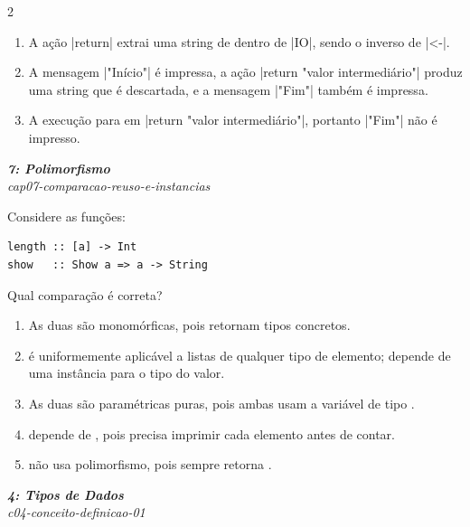 \documentclass[a4paper,10pt,brazil]{article}
\begin{document}
\begin{multicols}{2}
\begin{enumerate}
  \item A ação \haskellinline|return| extrai uma string de dentro de \haskellinline|IO|, sendo o inverso de \haskellinline|<-|.

  \item A mensagem \haskellinline|"Início"| é impressa, a ação \haskellinline|return "valor intermediário"| produz uma string que é descartada, e a mensagem \haskellinline|"Fim"| também é impressa.

  \item A execução para em \haskellinline|return "valor intermediário"|, portanto \haskellinline|"Fim"| não é impresso.


\end{enumerate}

\begin{flushright}
  \footnotesize
  \textit{\textbf{7: Polimorfismo}}\\
  \textit{cap07-comparacao-reuso-e-instancias}\\

\end{flushright}
Considere as funções:

\begin{verbatim}
length :: [a] -> Int
show   :: Show a => a -> String
\end{verbatim}

Qual comparação é correta?

\begin{enumerate}
  \item As duas são monomórficas, pois retornam tipos concretos.
  \item {} é uniformemente aplicável a listas de qualquer tipo de elemento;  depende de uma instância  para o tipo do valor.
  \item As duas são paramétricas puras, pois ambas usam a variável de tipo .
  \item {} depende de , pois precisa imprimir cada elemento antes de contar.
  \item {} não usa polimorfismo, pois sempre retorna .

\end{enumerate}

\begin{flushright}
  \footnotesize
  \textit{\textbf{4: Tipos de Dados}}\\
  \textit{c04-conceito-definicao-01}\\


\end{flushright}
\end{multicols}
\end{document}
